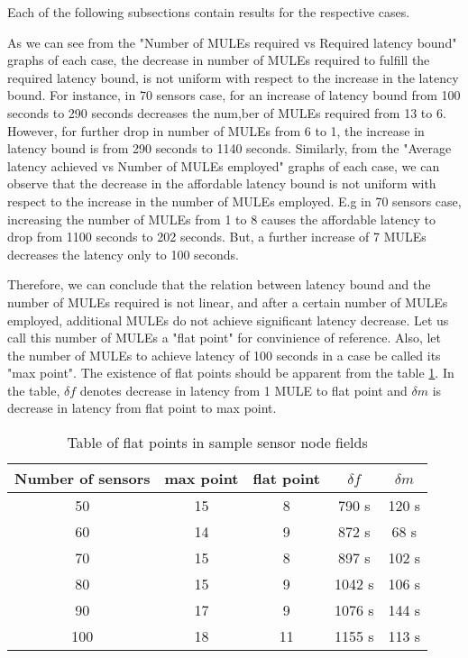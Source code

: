 Each of the following subsections contain results for the respective cases.

As we can see from the "Number of MULEs required vs Required latency bound" graphs of each case, the decrease in number of MULEs required to fulfill the required latency bound, is not uniform with respect to the increase in the latency bound. For instance, in 70 sensors case, for an increase of latency bound from 100 seconds to 290 seconds decreases the num,ber of MULEs required from 13 to 6. However, for further drop in number of MULEs from 6 to 1, the increase in latency bound is from 290 seconds to 1140 seconds. Similarly, from the "Average latency achieved vs Number of MULEs employed" graphs of each case, we can observe that the decrease in the affordable latency bound is not uniform with respect to the increase in the number of MULEs employed. E.g in 70 sensors case, increasing the number of MULEs from 1 to 8 causes the affordable latency to drop from 1100 seconds to 202 seconds. But, a further increase of 7 MULEs decreases the latency only to 100 seconds. 

Therefore, we can conclude that the relation between latency bound and the number of MULEs required is not linear, and after a certain number of MULEs employed, additional MULEs do not achieve significant latency decrease. Let us call this number of MULEs a "flat point" for convinience of reference. Also, let the number of MULEs to achieve latency of 100 seconds in a case be called its "max point". The existence of flat points should be apparent from the table \ref{table:flat}. In the table, $\delta f$ denotes decrease in latency from 1 MULE to flat point and $\delta m$ is decrease in latency from flat point to max point.

\begin{table}
\centering
\caption{Table of flat points in sample sensor node fields} \label{table:flat}
 \begin{tabular}{||c c c c c||}
 \hline
 Number of sensors & max point & flat point & $\delta f$ & $\delta m$ \\  
 \hline\hline
 50 & 15 & 8 & 790 s & 120 s\\ 
 \hline
 60 & 14 & 9 & 872 s & 68 s\\
 \hline
 70 & 15 & 8 & 897 s & 102 s\\
 \hline
 80 & 15 & 9 & 1042 s & 106 s\\
 \hline
 90 & 17 & 9 & 1076 s & 144 s\\
 \hline
 100 & 18 & 11 & 1155 s & 113 s\\
 \hline
\end{tabular}
\end{table}

